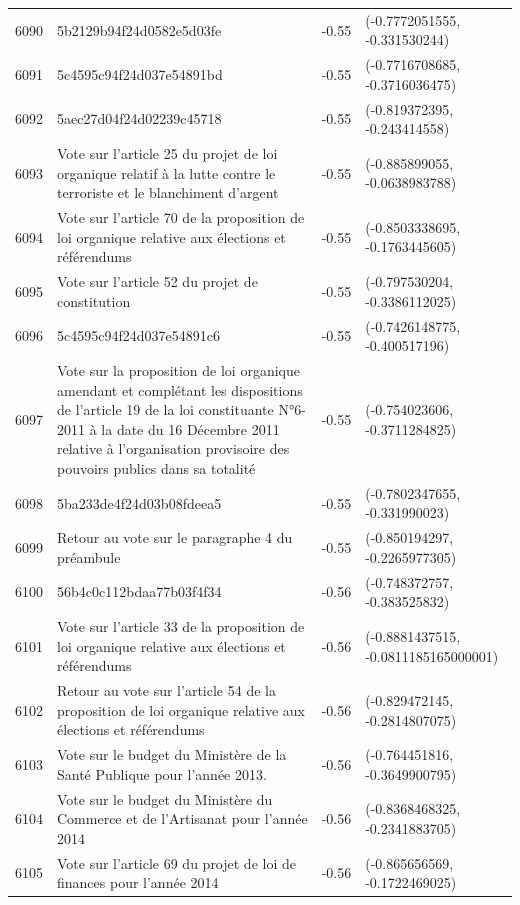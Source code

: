 \begin{table}[ht]
\begin{tabular}{rlrl}
  6090 & 5b2129b94f24d0582e5d03fe & -0.55 & (-0.7772051555, -0.331530244) \\ 
  6091 & 5c4595c94f24d037e54891bd & -0.55 & (-0.7716708685, -0.3716036475) \\ 
  6092 & 5aec27d04f24d02239c45718 & -0.55 & (-0.819372395, -0.243414558) \\ 
  6093 & Vote sur l'article 25 du projet de loi organique relatif à la lutte contre le terroriste et le blanchiment d'argent & -0.55 & (-0.885899055, -0.0638983788) \\ 
  6094 & Vote sur l'article 70 de la proposition de loi organique relative aux élections et référendums & -0.55 & (-0.8503338695, -0.1763445605) \\ 
  6095 & Vote sur l'article 52 du projet de constitution & -0.55 & (-0.797530204, -0.3386112025) \\ 
  6096 & 5c4595c94f24d037e54891c6 & -0.55 & (-0.7426148775, -0.400517196) \\ 
  6097 & Vote sur la proposition de loi organique amendant et complétant les dispositions de l'article 19 de la loi constituante N°6-2011 à la date du 16 Décembre 2011 relative à l'organisation provisoire des pouvoirs publics dans sa totalité & -0.55 & (-0.754023606, -0.3711284825) \\ 
  6098 & 5ba233de4f24d03b08fdeea5 & -0.55 & (-0.7802347655, -0.331990023) \\ 
  6099 & Retour au vote sur le paragraphe 4 du préambule & -0.55 & (-0.850194297, -0.2265977305) \\ 
  6100 & 56b4c0c112bdaa77b03f4f34 & -0.56 & (-0.748372757, -0.383525832) \\ 
  6101 & Vote sur l'article 33 de la proposition de loi organique relative aux élections et référendums & -0.56 & (-0.8881437515, -0.0811185165000001) \\ 
  6102 & Retour au vote sur l'article 54 de la proposition de loi organique relative aux élections et référendums & -0.56 & (-0.829472145, -0.2814807075) \\ 
  6103 & Vote sur le budget du Ministère de la Santé Publique pour l'année 2013. & -0.56 & (-0.764451816, -0.3649900795) \\ 
  6104 & Vote sur le budget du Ministère du Commerce et de l'Artisanat pour l'année 2014 & -0.56 & (-0.8368468325, -0.2341883705) \\ 
  6105 & Vote sur l'article 69 du projet de loi de finances pour l'année 2014 & -0.56 & (-0.865656569, -0.1722469025) \\ 

\end{tabular}
\end{table}
